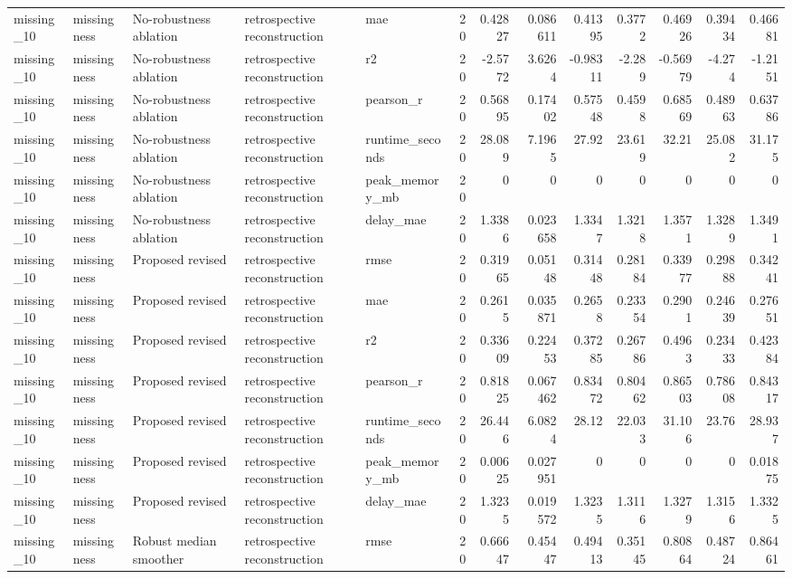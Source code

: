 \begin{table}[!htbp]
{{\begin{tabular}{lllllrrrrrrrr}
missing_10 & missingness & No-robustness ablation & retrospective reconstruction & mae & 20 & 0.42827 & 0.086611 & 0.41395 & 0.3772 & 0.46926 & 0.39434 & 0.46681 \\
missing_10 & missingness & No-robustness ablation & retrospective reconstruction & r2 & 20 & -2.5772 & 3.6264 & -0.98311 & -2.289 & -0.56979 & -4.274 & -1.2151 \\
missing_10 & missingness & No-robustness ablation & retrospective reconstruction & pearson_r & 20 & 0.56895 & 0.17402 & 0.57548 & 0.4598 & 0.68569 & 0.48963 & 0.63786 \\
missing_10 & missingness & No-robustness ablation & retrospective reconstruction & runtime_seconds & 20 & 28.089 & 7.1965 & 27.92 & 23.619 & 32.21 & 25.082 & 31.175 \\
missing_10 & missingness & No-robustness ablation & retrospective reconstruction & peak_memory_mb & 20 & 0 & 0 & 0 & 0 & 0 & 0 & 0 \\
missing_10 & missingness & No-robustness ablation & retrospective reconstruction & delay_mae & 20 & 1.3386 & 0.023658 & 1.3347 & 1.3218 & 1.3571 & 1.3289 & 1.3491 \\
missing_10 & missingness & Proposed revised & retrospective reconstruction & rmse & 20 & 0.31965 & 0.05148 & 0.31448 & 0.28184 & 0.33977 & 0.29888 & 0.34241 \\
missing_10 & missingness & Proposed revised & retrospective reconstruction & mae & 20 & 0.2615 & 0.035871 & 0.2658 & 0.23354 & 0.2901 & 0.24639 & 0.27651 \\
missing_10 & missingness & Proposed revised & retrospective reconstruction & r2 & 20 & 0.33609 & 0.22453 & 0.37285 & 0.26786 & 0.4963 & 0.23433 & 0.42384 \\
missing_10 & missingness & Proposed revised & retrospective reconstruction & pearson_r & 20 & 0.81825 & 0.067462 & 0.83472 & 0.80462 & 0.86503 & 0.78608 & 0.84317 \\
missing_10 & missingness & Proposed revised & retrospective reconstruction & runtime_seconds & 20 & 26.446 & 6.0824 & 28.12 & 22.033 & 31.106 & 23.76 & 28.937 \\
missing_10 & missingness & Proposed revised & retrospective reconstruction & peak_memory_mb & 20 & 0.00625 & 0.027951 & 0 & 0 & 0 & 0 & 0.01875 \\
missing_10 & missingness & Proposed revised & retrospective reconstruction & delay_mae & 20 & 1.3235 & 0.019572 & 1.3235 & 1.3116 & 1.3279 & 1.3156 & 1.3325 \\
missing_10 & missingness & Robust median smoother & retrospective reconstruction & rmse & 20 & 0.66647 & 0.45447 & 0.49413 & 0.35145 & 0.80864 & 0.48724 & 0.86461 \\

\end{tabular}}}
\end{table}

